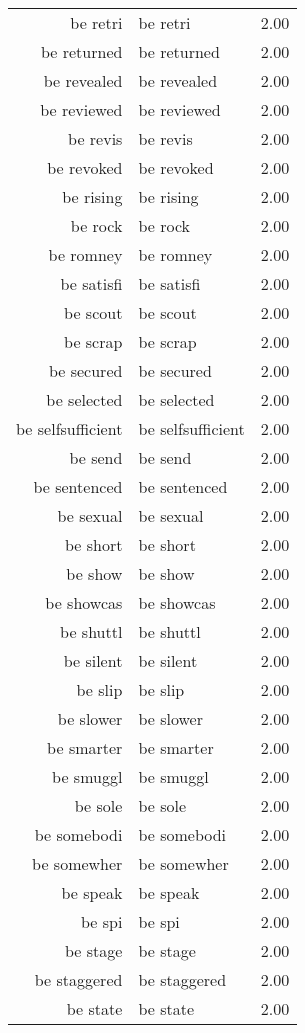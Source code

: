 \begin{table}[ht]
\begin{tabular}{rlr}
  be retri & be retri & 2.00 \\ 
  be returned & be returned & 2.00 \\ 
  be revealed & be revealed & 2.00 \\ 
  be reviewed & be reviewed & 2.00 \\ 
  be revis & be revis & 2.00 \\ 
  be revoked & be revoked & 2.00 \\ 
  be rising & be rising & 2.00 \\ 
  be rock & be rock & 2.00 \\ 
  be romney & be romney & 2.00 \\ 
  be satisfi & be satisfi & 2.00 \\ 
  be scout & be scout & 2.00 \\ 
  be scrap & be scrap & 2.00 \\ 
  be secured & be secured & 2.00 \\ 
  be selected & be selected & 2.00 \\ 
  be selfsufficient & be selfsufficient & 2.00 \\ 
  be send & be send & 2.00 \\ 
  be sentenced & be sentenced & 2.00 \\ 
  be sexual & be sexual & 2.00 \\ 
  be short & be short & 2.00 \\ 
  be show & be show & 2.00 \\ 
  be showcas & be showcas & 2.00 \\ 
  be shuttl & be shuttl & 2.00 \\ 
  be silent & be silent & 2.00 \\ 
  be slip & be slip & 2.00 \\ 
  be slower & be slower & 2.00 \\ 
  be smarter & be smarter & 2.00 \\ 
  be smuggl & be smuggl & 2.00 \\ 
  be sole & be sole & 2.00 \\ 
  be somebodi & be somebodi & 2.00 \\ 
  be somewher & be somewher & 2.00 \\ 
  be speak & be speak & 2.00 \\ 
  be spi & be spi & 2.00 \\ 
  be stage & be stage & 2.00 \\ 
  be staggered & be staggered & 2.00 \\ 
  be state & be state & 2.00 \\ 

\end{tabular}
\end{table}
